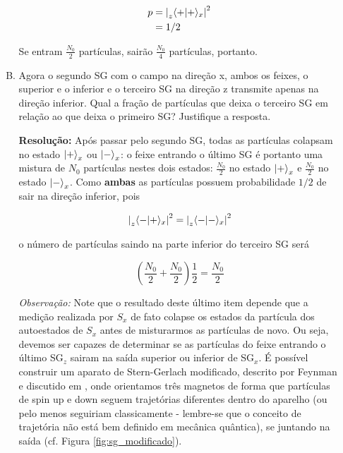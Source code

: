 \documentclass[a4paper, 12pt, notitlepage]{article}
\begin{document}
\begin{enumerate}
\begin{enumerate}[(A)]
  \begin{align*}
  p &= \left|\prescript{}{z}{\left\langle +|+\right\rangle}_x\right|^2 \\
  &= 1/2
  \end{align*}
  
  Se entram $\frac{N_0}{2}$ partículas, sairão $\frac{N_0}{4}$ partículas, portanto.
  
  \item Agora o segundo SG com o campo na direção x, ambos os feixes, o superior e o inferior e o terceiro SG na direção z transmite apenas na direção inferior. Qual a fração de partículas que deixa o terceiro SG em relação ao que deixa o primeiro SG? Justifique a resposta.
  
  \textbf{Resolução:}
  Após passar pelo segundo SG, todas as partículas colapsam no estado $\ket{+}_x$ ou $\ket{-}_x$: o feixe entrando o último SG é portanto uma mistura de $N_0$ partículas nestes dois estados: $\frac{N_0}{2}$ no estado $\ket{+}_x$ e $\frac{N_0}{2}$ no estado $\ket{-}_x$. Como \textbf{ambas} as partículas possuem probabilidade $1/2$ de sair na direção inferior, pois
  
  \[
  \left|\prescript{}{z}{\left\langle -|+\right\rangle}_x\right|^2 = \left|\prescript{}{z}{\left\langle -|-\right\rangle}_x\right|^2
  \]
  
  \noindent o número de partículas saindo na parte inferior do terceiro SG será
  
  \[
  \left(\frac{N_0}{2} + \frac{N_0}{2}\right) \frac{1}{2} = \frac{N_0}{2}
  \]
  
  \textit{Observação:} Note que o resultado deste último item depende que a medição realizada por $S_x$ de fato colapse os estados da partícula dos autoestados de $S_x$ antes de misturarmos as partículas de novo. Ou seja, devemos ser capazes de determinar se as partículas do feixe entrando o último SG$_z$ sairam na saída superior ou inferior de SG$_x$. É possível construir um aparato de Stern-Gerlach modificado, descrito por Feynman e discutido em \cite{townsend}, onde orientamos três magnetos de forma que partículas de spin up e down seguem trajetórias diferentes dentro do aparelho (ou pelo menos seguiriam classicamente - lembre-se que o conceito de trajetória não está bem definido em mecânica quântica), se juntando na saída (cf. Figura \ref{fig:sg_modificado}).
  

\end{enumerate}
\end{enumerate}
\end{document}
